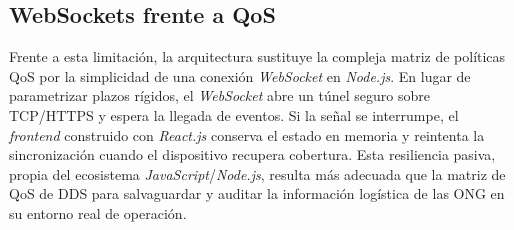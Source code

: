 \subsection{WebSockets frente a QoS}

Frente a esta limitación, la arquitectura sustituye la compleja matriz de políticas
QoS por la simplicidad de una conexión \textit{WebSocket} en \textit{Node.js}. En
lugar de parametrizar plazos rígidos, el \textit{WebSocket} abre un túnel seguro
sobre TCP/HTTPS y espera la llegada de eventos. Si la señal se interrumpe, el
\textit{frontend} construido con \textit{React.js} conserva el estado en memoria y
reintenta la sincronización cuando el dispositivo recupera cobertura. Esta
resiliencia pasiva, propia del ecosistema \textit{JavaScript}/\textit{Node.js},
resulta más adecuada que la matriz de QoS de DDS para salvaguardar y auditar la
información logística de las ONG en su entorno real de operación.
